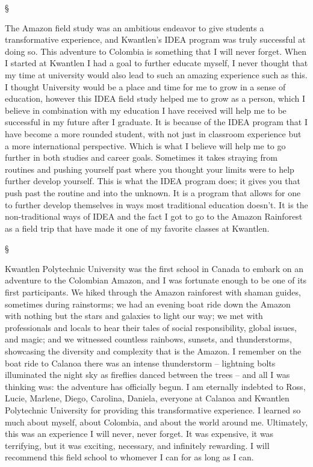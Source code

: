\documentclass[letterpaper,10pt,headsepline]{scrreprt}
\begin{document}
\begin{center}§\end{center}

The Amazon field study was an ambitious endeavor to give students a
transformative experience, and Kwantlen's IDEA program was truly
successful at doing so. This adventure to Colombia is something that I
will never forget. When I started at Kwantlen I had a goal to further
educate myself, I never thought that my time at university would also
lead to such an amazing experience such as this. I thought University
would be a place and time for me to grow in a sense of education,
however this IDEA field study helped me to grow as a person, which I
believe in combination with my education I have received will help me to
be successful in my future after I graduate. It is because of the IDEA
program that I have become a more rounded student, with not just in
classroom experience but a more international perspective. Which is what
I believe will help me to go further in both studies and career goals.
Sometimes it takes straying from routines and pushing yourself past
where you thought your limits were to help further develop yourself.
This is what the IDEA program does; it gives you that push past the
routine and into the unknown. It is a program that allows for one to
further develop themselves in ways most traditional education doesn't.
It is the non-traditional ways of IDEA and the fact I got to go to the
Amazon Rainforest as a field trip that have made it one of my favorite
classes at Kwantlen.

\begin{center}§\end{center}

Kwantlen Polytechnic University was the first school in Canada to embark
on an adventure to the Colombian Amazon, and I was fortunate enough to
be one of its first participants. We hiked through the Amazon rainforest
with shaman guides, sometimes during rainstorms; we had an evening boat
ride down the Amazon with nothing but the stars and galaxies to light
our way; we met with professionals and locals to hear their tales of
social responsibility, global issues, and magic; and we witnessed
countless rainbows, sunsets, and thunderstorms, showcasing the diversity
and complexity that is the Amazon. I remember on the boat ride to
Calanoa there was an intense thunderstorm -- lightning bolts illuminated
the night sky as fireflies danced between the trees -- and all I was
thinking was: the adventure has officially begun. I am eternally
indebted to Ross, Lucie, Marlene, Diego, Carolina, Daniela, everyone at
Calanoa and Kwantlen Polytechnic University for providing this
transformative experience. I learned so much about myself, about
Colombia, and about the world around me. Ultimately, this was an
experience I will never, never forget. It was expensive, it was
terrifying, but it was exciting, necessary, and infinitely rewarding. I
will recommend this field school to whomever I can for as long as I can.
\end{document}
